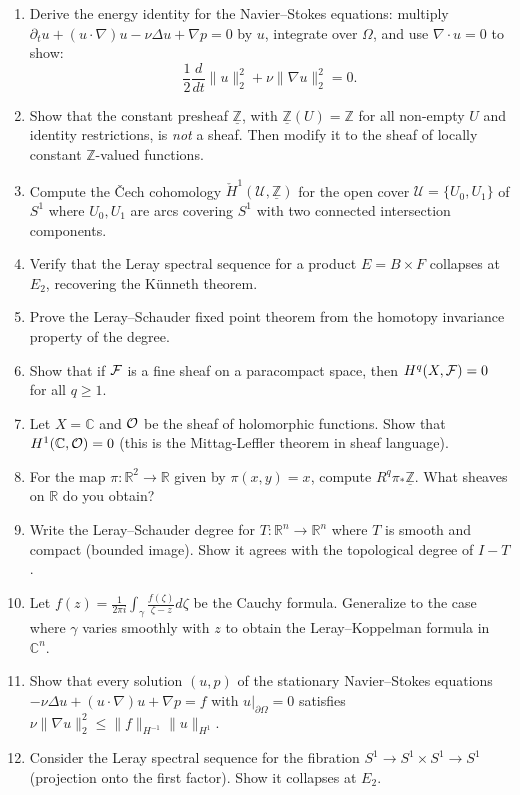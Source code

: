 \begin{enumerate}
    \item [B] Derive the energy identity for the Navier--Stokes equations: multiply $\partial_t u + (u \cdot \nabla)u - \nu \Delta u + \nabla p = 0$ by $u$, integrate over $\Omega$, and use $\nabla \cdot u = 0$ to show:
    \[
    \frac{1}{2}\frac{d}{dt}\|u\|_2^2 + \nu\|\nabla u\|_2^2 = 0.
    \]
    \item [B] Show that the constant presheaf $\underline{\mathbb{Z}}$, with $\underline{\mathbb{Z}}(U) = \mathbb{Z}$ for all non-empty $U$ and identity restrictions, is \textit{not} a sheaf. Then modify it to the sheaf of locally constant $\mathbb{Z}$-valued functions.
    \item [I] Compute the \v{C}ech cohomology $\check{H}^1(\mathcal{U}, \underline{\mathbb{Z}})$ for the open cover $\mathcal{U} = \{U_0, U_1\}$ of $S^1$ where $U_0, U_1$ are arcs covering $S^1$ with two connected intersection components.
    \item [I] Verify that the Leray spectral sequence for a product $E = B \times F$ collapses at $E_2$, recovering the K{\"u}nneth theorem.
    \item [I] Prove the Leray--Schauder fixed point theorem from the homotopy invariance property of the degree.
    \item [I] Show that if $\mathcal{F}$ is a fine sheaf on a paracompact space, then $H^q(X, \mathcal{F}) = 0$ for all $q \geq 1$.
    \item [I] Let $X = \mathbb{C}$ and $\mathcal{O}$ be the sheaf of holomorphic functions. Show that $H^1(\mathbb{C}, \mathcal{O}) = 0$ (this is the Mittag-Leffler theorem in sheaf language).
    \item [I] For the map $\pi: \mathbb{R}^2 \to \mathbb{R}$ given by $\pi(x,y) = x$, compute $R^q \pi_* \underline{\mathbb{Z}}$. What sheaves on $\mathbb{R}$ do you obtain?
    \item [I] Write the Leray--Schauder degree for $T: \mathbb{R}^n \to \mathbb{R}^n$ where $T$ is smooth and compact (bounded image). Show it agrees with the topological degree of $I - T$.
    \item [A] Let $f(z) = \frac{1}{2\pi i}\int_{\gamma} \frac{f(\zeta)}{\zeta - z}d\zeta$ be the Cauchy formula. Generalize to the case where $\gamma$ varies smoothly with $z$ to obtain the Leray--Koppelman formula in $\mathbb{C}^n$.
    \item [I] Show that every solution $(u,p)$ of the stationary Navier--Stokes equations $-\nu \Delta u + (u \cdot \nabla)u + \nabla p = f$ with $u|_{\partial\Omega} = 0$ satisfies $\nu \|\nabla u\|_2^2 \leq \|f\|_{H^{-1}}\|u\|_{H^1}$.
    \item [B] Consider the Leray spectral sequence for the fibration $S^1 \to S^1 \times S^1 \to S^1$ (projection onto the first factor). Show it collapses at $E_2$.
\end{enumerate}

